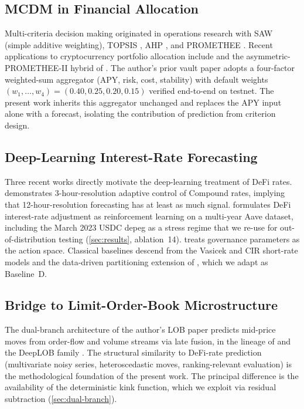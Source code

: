 \documentclass[11pt,a4paper]{article}
\begin{document}
\subsection{MCDM in Financial Allocation}
\label{sec:mcdm-bg}

Multi-criteria decision making originated in operations research with
SAW (simple additive weighting), TOPSIS \cite{hwang1981topsis},
AHP \cite{saaty1980ahp}, and PROMETHEE \cite{brans1985promethee}.
Recent applications to cryptocurrency portfolio allocation include
\cite{aljinovic2021crypto} and the asymmetric-PROMETHEE-II hybrid of
\cite{hosseinzadeh2023crypto}. The author's prior vault paper
\cite{solovev2026vault} adopts a four-factor weighted-sum aggregator
(APY, risk, cost, stability) with default weights
$(w_1,\ldots,w_4)=(0.40,0.25,0.20,0.15)$ verified end-to-end on testnet.
The present work inherits this aggregator unchanged and replaces the
APY input alone with a forecast, isolating the contribution of
prediction from criterion design.

\subsection{Deep-Learning Interest-Rate Forecasting}
\label{sec:rate-forecast-bg}

Three recent works directly motivate the deep-learning treatment of
DeFi rates. \cite{agilerate2024} demonstrates 3-hour-resolution
adaptive control of Compound rates, implying that 12-hour-resolution
forecasting has at least as much signal.
\cite{rules2rewards2025} formulates DeFi interest-rate adjustment as
reinforcement learning on a multi-year Aave dataset, including the
March 2023 USDC depeg as a stress regime that we re-use for
out-of-distribution testing (\cref{sec:results}, ablation~14).
\cite{autogov2023} treats governance parameters as the action space.
Classical baselines descend from the Vasicek
\cite{vasicek1977} and CIR \cite{cir1985} short-rate models and the
data-driven partitioning extension of \cite{orlando2020cir}, which we
adapt as Baseline~D.

\subsection{Bridge to Limit-Order-Book Microstructure}
\label{sec:lob-bridge}

The dual-branch architecture of the author's LOB paper
\cite{solovev2026lob} predicts mid-price moves from order-flow and
volume streams via late fusion, in the lineage of
\cite{simonyan2014twostream} and the DeepLOB family
\cite{sirignano2016deeplob,zhang2019deeplob,wallbridge2020transformerlob}.
The structural similarity to DeFi-rate prediction (multivariate noisy
series, heteroscedastic moves, ranking-relevant evaluation) is the
methodological foundation of the present work. The principal
difference is the availability of the deterministic kink function,
which we exploit via residual subtraction
(\cref{sec:dual-branch}).
\end{document}
